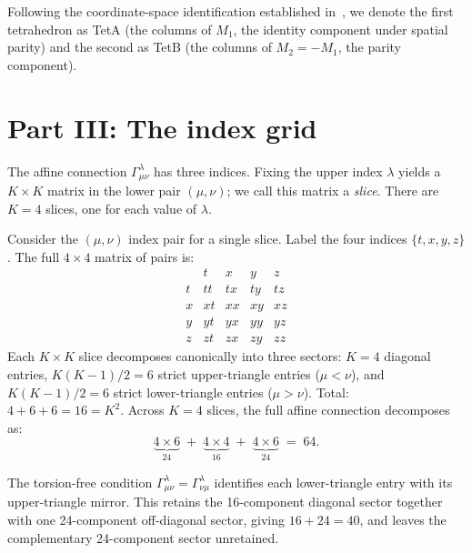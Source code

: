 \documentclass[twocolumn]{iopjournal}
\theoremstyle{definition}
\begin{document}
Following the coordinate-space identification established
in~\cite{Nelson2026a}, we denote the first tetrahedron as TetA (the
columns of $M_1$, the identity component under spatial parity) and the
second as TetB (the columns of $M_2 = -M_1$, the parity component).


\section*{Part III: The index grid}

The affine connection $\Gamma^\lambda_{\mu\nu}$ has three indices.
Fixing the upper index $\lambda$ yields a $K \times K$ matrix in the
lower pair $(\mu,\nu)$; we call this matrix a \textit{slice}.  There
are $K = 4$ slices, one for each value of $\lambda$.

Consider the $(\mu,\nu)$ index pair for a single slice.  Label the
four indices $\{t,x,y,z\}$.  The full $4 \times 4$ matrix of pairs is:
\begin{equation}
  \begin{array}{c|cccc}
    & t & x & y & z \\
    \hline
    t & tt & tx & ty & tz \\
    x & xt & xx & xy & xz \\
    y & yt & yx & yy & yz \\
    z & zt & zx & zy & zz
  \end{array}
  \label{eq:grid}
\end{equation}
Each $K \times K$ slice decomposes canonically into three sectors:
$K = 4$ diagonal entries, $K(K{-}1)/2 = 6$ strict upper-triangle
entries ($\mu < \nu$), and $K(K{-}1)/2 = 6$ strict lower-triangle
entries ($\mu > \nu$).  Total: $4 + 6 + 6 = 16 = K^2$.
Across $K = 4$ slices, the full affine connection decomposes as:
\begin{equation}
  \underbrace{4 \times 6}_{24}
  \;+\;
  \underbrace{4 \times 4}_{16}
  \;+\;
  \underbrace{4 \times 6}_{24}
  \;=\; 64.
  \label{eq:connection_decomp}
\end{equation}

The torsion-free condition
$\Gamma^\lambda_{\mu\nu} = \Gamma^\lambda_{\nu\mu}$ identifies each
lower-triangle entry with its upper-triangle mirror.  This retains the
16-component diagonal sector together with one 24-component off-diagonal
sector, giving $16 + 24 = 40$, and leaves the complementary
24-component sector unretained.
\end{document}
